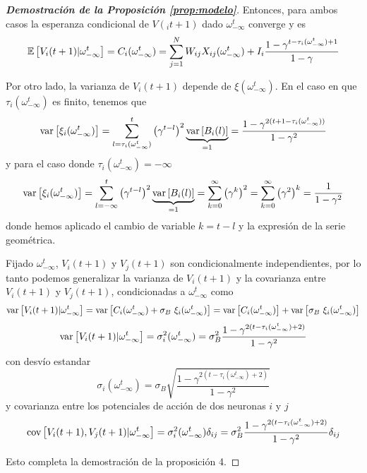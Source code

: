 \begin{proof}[\bf{Demostración de la Proposición \ref{prop:modelo}}]
Entonces, para ambos casos la esperanza condicional de $V(_it+1)$ dado $\omega_{-\infty}^t$ converge y es
\begin{equation}
    \mathbb{E} \left[V_i(t+1) | \omega_{-\infty}^t\right] = C_i(\omega_{-\infty}^t) =
    \sum_{j=1}^N W_{ij} X_{ij}(\omega_{-\infty}^t) + I_i \frac{1-\gamma^{t-\tau_i(\omega_{-\infty}^t)+1}}{1-\gamma}
\end{equation}

Por otro lado, la varianza de $V_i(t+1)$ depende de $\xi(\omega_{-\infty}^t)$. En el caso en que $\tau_i(\omega_{-\infty}^t)$ es finito, tenemos que
\begin{equation*}
    \text{var}\left[\xi_i(\omega_{-\infty}^t)\right] = \sum_{l=\tau_i(\omega_{-\infty}^t)}^t \left(\gamma^{t-l}\right)^2 \underbrace{\text{var}\left[B_i(l)\right]}_{=1} = \frac{1-\gamma^{2(t+1-\tau_i(\omega_{-\infty}^t))}}{1-\gamma^2}
\end{equation*}
y para el caso donde $\tau_i(\omega_{-\infty}^t) = -\infty$ 
\begin{equation*}
    \text{var}\left[\xi_i(\omega_{-\infty}^t)\right] = \sum_{l=-\infty}^t \left(\gamma^{t-l}\right)^2 \underbrace{\text{var}\left[B_i(l)\right]}_{=1} = \sum_{k=0}^\infty \left(\gamma^k\right)^2 = \sum_{k=0}^\infty \left(\gamma^2\right)^k =\frac{1}{1-\gamma^2}
\end{equation*}
donde hemos aplicado el cambio de variable $k=t-l$ y la expresión de la serie geométrica.

Fijado $\omega_{-\infty}^t$, $V_i(t+1)$ y $V_j(t+1)$ son condicionalmente independientes, por lo tanto podemos generalizar la varianza de $V_i(t+1)$ y la covarianza entre $V_i(t+1)$ y $V_j(t+1)$, condicionadas a $\omega_{-\infty}^t$ como
\begin{equation}
    \text{var}\left[V_i(t+1) | \omega_{-\infty}^t\right] = \text{var}\left[C_i(\omega_{-\infty}^t) + \sigma_B \  \xi_i(\omega_{-\infty}^t)\right] = \text{var}\left[C_i(\omega_{-\infty}^t)\right] + \text{var}\left[ \sigma_B \  \xi_i(\omega_{-\infty}^t)\right] 
\end{equation}
\begin{equation}
    \text{var}\left[V_i(t+1) | \omega_{-\infty}^t\right] = \sigma_i^2(\omega_{-\infty}^t) = \sigma_B^2 \frac{1-\gamma^{2(t-\tau_i(\omega_{-\infty}^t)+2)}}{1-\gamma^2}
    \label{eqn:sigma2}
\end{equation}
con desvío estandar
\begin{equation}
    \sigma_i(\omega_{-\infty}^t) = \sigma_B \sqrt{\frac{1-\gamma^{2(t-\tau_i(\omega_{-\infty}^t)+2)}}{1-\gamma^2}}
    \label{eqn:sigmai}
\end{equation}
y covarianza entre los potenciales de acción de dos neuronas $i$ y $j$
\begin{equation}
    \text{cov}\left[V_i(t+1),V_j(t+1) | \omega_{-\infty}^t\right] = \sigma_i^2(\omega_{-\infty}^t) \delta_{ij} = \sigma_B^2 \frac{1-\gamma^{2(t-\tau_i(\omega_{-\infty}^t)+2)}}{1-\gamma^2} \delta_{ij}
\end{equation}

Esto completa la demostración de la proposición 4.

\end{proof}

